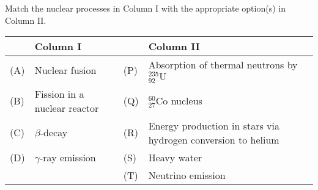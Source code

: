 \item Match the nuclear processes in Column I with the appropriate option(s) in Column II.
\begin{center}
    \renewcommand{\arraystretch}{2}
    \begin{table}[h]
        \centering
        \begin{tabular}{p{0.5cm}p{6cm}|p{0.5cm}p{7cm}}
        \hline
        & Column I & & Column II \\
        \hline
        (A) & Nuclear fusion & (P) & Absorption of thermal neutrons by ${}^{235}_{92}\mathrm{U}$ \\
        (B) & Fission in a nuclear reactor & (Q) & ${}^{60}_{27}\mathrm{Co}$ nucleus \\
        (C) & $\beta$-decay & (R) & Energy production in stars via hydrogen conversion to helium \\
        (D) & $\gamma$-ray emission & (S) & Heavy water \\
         & & (T) & Neutrino emission \\
        \hline
        \end{tabular}
    \end{table}
\end{center}
